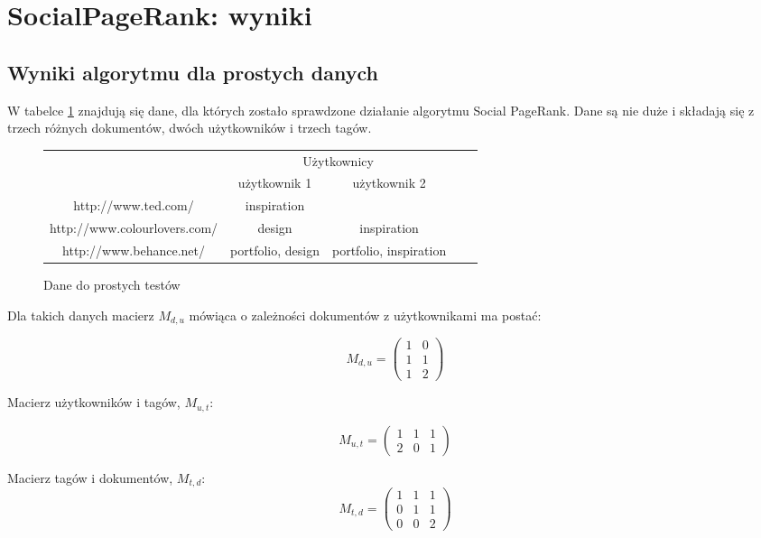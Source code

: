 \section{SocialPageRank: wyniki}

\subsection{Wyniki algorytmu dla prostych danych}

W tabelce \ref{fig:test_proste_dane} znajdują się dane, dla których zostało sprawdzone działanie algorytmu Social PageRank. Dane są nie duże i składają się z trzech różnych dokumentów, dwóch użytkowników i trzech tagów.

\begin{figure}
  \centering
  \begin{tabular}{|c|c|c|c|c|}
    \hline
    \multicolumn{1}{|c|}{}&\multicolumn{2}{c|}{Użytkownicy}\\

    \cline{2-3}
    \multicolumn{1}{|c|}{}&użytkownik 1&użytkownik 2\\
    \hline
 	http://www.ted.com/ & inspiration & \\
	http://www.colourlovers.com/&	design & inspiration \\
	http://www.behance.net/	&portfolio, design & portfolio, inspiration \\
    \hline
  \end{tabular}
  \caption{Dane do prostych testów}
  \label{fig:test_proste_dane}
\end{figure}

Dla takich danych macierz $M_{d,u}$ mówiąca o zależności dokumentów z użytkownikami ma postać:

\[
 M_{d,u} =
 \begin{pmatrix}
  1 & 0 \\
  1 & 1 \\
  1 & 2
 \end{pmatrix}
\]

Macierz użytkowników i tagów, $M_{u,t}$:

\[
 M_{u,t} =
 \begin{pmatrix}
  1 & 1 & 1 \\
  2 & 0 & 1 
 \end{pmatrix}
\]

Macierz tagów i dokumentów, $M_{t,d}$:
\[
 M_{t,d} =
 \begin{pmatrix}
  1 & 1 & 1 \\
  0 & 1 & 1 \\
  0 & 0 & 2 
 \end{pmatrix}
\]


